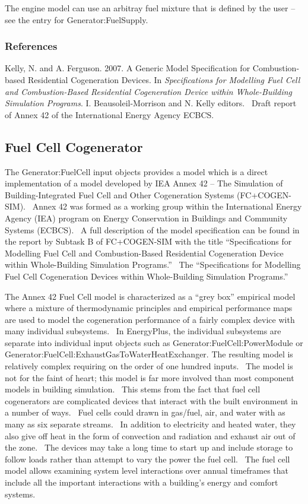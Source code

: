 The engine model can use an arbitray fuel mixture that is defined by the user -- see the entry for Generator:FuelSupply.

\subsubsection{References}\label{references-024}

Kelly, N. and A. Ferguson. 2007. A Generic Model Specification for Combustion-based Residential Cogeneration Devices. In \emph{Specifications for Modelling Fuel Cell and Combustion-Based Residential Cogeneration Device within Whole-Building Simulation Programs}. I. Beausoleil-Morrison and N. Kelly editors.~ Draft report of Annex 42 of the International Energy Agency ECBCS.

\subsection{Fuel Cell Cogenerator}\label{fuel-cell-cogenerator}

The Generator:FuelCell input objects provides a model which is a direct implementation of a model developed by IEA Annex 42 -- The Simulation of Building-Integrated Fuel Cell and Other Cogeneration Systems (FC+COGEN-SIM).~ Annex 42 was formed as a working group within the International Energy Agency (IEA) program on Energy Conservation in Buildings and Community Systems (ECBCS).~ A full description of the model specification can be found in the report by Subtask B of FC+COGEN-SIM with the title ``Specifications for Modelling Fuel Cell and Combustion-Based Residential Cogeneration Device within Whole-Building Simulation Programs.''~ The ``Specifications for Modelling Fuel Cell Cogeneration Devices within Whole-Building Simulation Programs.''

The Annex 42 Fuel Cell model is characterized as a ``grey box'' empirical model where a mixture of thermodynamic principles and empirical performance maps are used to model the cogeneration performance of a fairly complex device with many individual subsystems.~ In EnergyPlus, the individual subsystems are separate into individual input objects such as Generator:FuelCell:PowerModule or Generator:FuelCell:ExhaustGasToWaterHeatExchanger. The resulting model is relatively complex requiring on the order of one hundred inputs.~ The model is not for the faint of heart; this model is far more involved than most component models in building simulation.~ This stems from the fact that fuel cell cogenerators are complicated devices that interact with the built environment in a number of ways.~ Fuel cells could drawn in gas/fuel, air, and water with as many as six separate streams.~ In addition to electricity and heated water, they also give off heat in the form of convection and radiation and exhaust air out of the zone.~ The devices may take a long time to start up and include storage to follow loads rather than attempt to vary the power the fuel cell.~ The fuel cell model allows examining system level interactions over annual timeframes that include all the important interactions with a building's energy and comfort systems.

